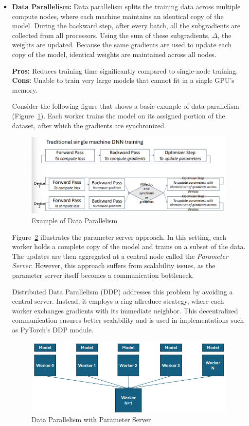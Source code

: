 \documentclass[12pt]{book}
\begin{document}
\begin{itemize}
    \item \textbf{Data Parallelism:}  
    Data parallelism splits the training data across multiple compute nodes, where each machine maintains an identical copy of the model. During the backward step, after every batch, all the subgradients are collected from all processors. Using the sum of these subgradients, $\Delta$, the weights are updated. Because the same gradients are used to update each copy of the model, identical weights are maintained across all nodes.

    \textbf{Pros:} Reduces training time significantly compared to single-node training.  
    \textbf{Cons:} Unable to train very large models that cannot fit in a single GPU's memory.  

    Consider the following figure that shows a basic example of data parallelism (Figure~\ref{fig:datapll}). Each worker trains the model on its assigned portion of the dataset, after which the gradients are synchronized.  

    \begin{figure}[ht]
        \centering
        \includegraphics[width=0.5\linewidth]{images/datapll.png}
        \caption{Example of Data Parallelism}
        \label{fig:datapll}
    \end{figure}

    Figure~\ref{fig:dPll} illustrates the parameter server approach. In this setting, each worker holds a complete copy of the model and trains on a subset of the data. The updates are then aggregated at a central node called the \textit{Parameter Server}. However, this approach suffers from scalability issues, as the parameter server itself becomes a communication bottleneck.  

    Distributed Data Parallelism (DDP) addresses this problem by avoiding a central server. Instead, it employs a ring-allreduce strategy, where each worker exchanges gradients with its immediate neighbor. This decentralized communication ensures better scalability and is used in implementations such as PyTorch’s DDP module.  

    \begin{figure}[ht]
        \centering
        \includegraphics[width=0.75\linewidth]{images/Ddpll.png}
        \caption{Data Parallelism with Parameter Server}
        \label{fig:dPll}
    \end{figure}


\end{itemize}
\end{document}
